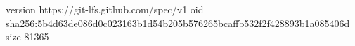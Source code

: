 version https://git-lfs.github.com/spec/v1
oid sha256:5b4d63de086d0c023163b1d54b205b576265bcaffb532f2f428893b1a085406d
size 81365
